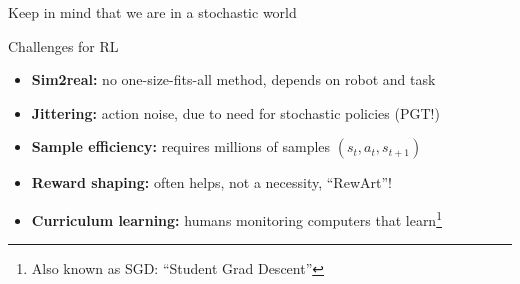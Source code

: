 \documentclass[10pt, aspectratio=1610]{beamer}
\begin{document}

\begin{frame}{Keep in mind that we are in a stochastic world}
    \begin{figure}
        \centering
    \end{figure}
\end{frame}

\begin{frame}{Challenges for RL}
    \begin{itemize}
        \item \textbf{Sim2real:} no one-size-fits-all method, depends on robot and task
        \item \textbf{Jittering:} action noise, due to need for stochastic policies (PGT!)
        \item \textbf{Sample efficiency:} requires millions of samples $(s_t, a_t, s_{t+1})$
        \item \textbf{Reward shaping:} often helps, not a necessity, ``RewArt''!
        \item \textbf{Curriculum learning:} humans monitoring computers that learn\footnote{ Also known as SGD: ``Student Grad Descent''}
    \end{itemize}
\end{frame}
\end{document}
